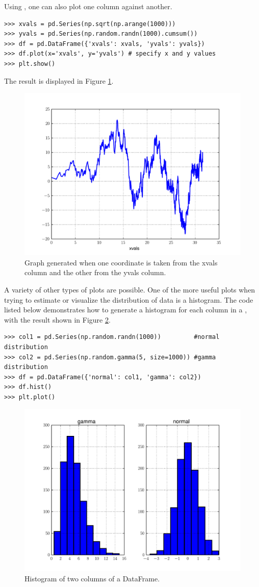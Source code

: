 Using , one can also plot one column against another.

\begin{lstlisting}
>>> xvals = pd.Series(np.sqrt(np.arange(1000)))
>>> yvals = pd.Series(np.random.randn(1000).cumsum())
>>> df = pd.DataFrame({'xvals': xvals, 'yvals': yvals})
>>> df.plot(x='xvals', y='yvals') # specify x and y values
>>> plt.show()
\end{lstlisting}

The result is displayed in Figure \ref{pandas:dfPlot}.

\begin{figure}
\centering
\includegraphics[width=.7 \textwidth]{dfPlot.pdf}
\caption{ Graph generated when one coordinate is taken from the xvals column and the other from the yvals column.}
\label{pandas:dfPlot}
\end{figure}

A variety of other types of plots are possible. One of the more useful plots when trying to estimate or
visualize the distribution of data is a histogram. The code listed below demonstrates how to generate
a histogram for each column in a , with the result shown in Figure \ref{pandas:histogram}.

\begin{lstlisting}
>>> col1 = pd.Series(np.random.randn(1000))         #normal distribution
>>> col2 = pd.Series(np.random.gamma(5, size=1000)) #gamma distribution
>>> df = pd.DataFrame({'normal': col1, 'gamma': col2})
>>> df.hist()
>>> plt.plot()
\end{lstlisting}

\begin{figure}
\centering
\includegraphics[width=.7 \textwidth]{histogram.pdf}
\caption{Histogram of two columns of a DataFrame.}
\label{pandas:histogram}
\end{figure}

